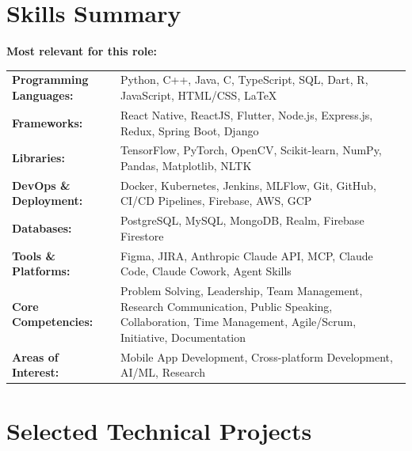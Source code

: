 \documentclass{article}
\begin{document}
\section{Skills Summary}
\small
\textbf{Most relevant for this role:} %
\vspace{4pt}

\renewcommand{\arraystretch}{0.8}
\begin{tabular}{p{4.8cm}p{13.5cm}}
  \textbf{Programming Languages:} & Python, C++, Java, C, TypeScript, SQL, Dart, R, JavaScript, HTML/CSS, LaTeX \\
  \textbf{Frameworks:} & React Native, ReactJS, Flutter, Node.js, Express.js, Redux, Spring Boot, Django \\
  \textbf{Libraries:} & TensorFlow, PyTorch, OpenCV, Scikit-learn, NumPy, Pandas, Matplotlib, NLTK \\
  \textbf{DevOps \& Deployment:} & Docker, Kubernetes, Jenkins, MLFlow, Git, GitHub, CI/CD Pipelines, Firebase, AWS, GCP \\
  \textbf{Databases:} & PostgreSQL, MySQL, MongoDB, Realm, Firebase Firestore \\
  \textbf{Tools \& Platforms:} & Figma, JIRA, Anthropic Claude API, MCP, Claude Code, Claude Cowork, Agent Skills \\
  \textbf{Core Competencies:} & Problem Solving, Leadership, Team Management, Research Communication, Public Speaking, Collaboration, Time Management, Agile/Scrum, Initiative, Documentation \\
  \textbf{Areas of Interest:} & Mobile App Development, Cross-platform Development, AI/ML, Research \\
\end{tabular}


\section{Selected Technical Projects}
\small


\end{document}
